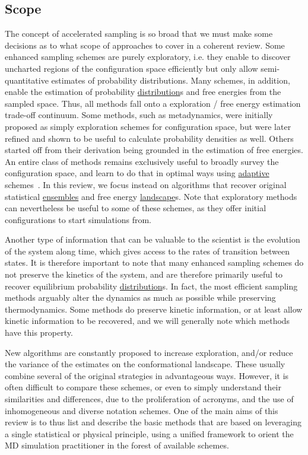 \documentclass[9pt,review]{livecoms}
\begin{document}
\subsection{Scope}
The concept of accelerated sampling is so broad that we must make some decisions as to what scope of approaches to cover in a coherent review.
Some enhanced sampling schemes are purely exploratory, i.e. they enable to discover uncharted regions of the configuration space efficiently but only allow semi-quantitative estimates of probability distributions. Many schemes, in addition, enable the estimation of probability \hyperlink{ref:Distribution} {distribution}s and free energies from the sampled space. Thus, all methods fall onto a exploration / free energy estimation trade-off continuum. Some methods, such as metadynamics, were initially proposed as simply exploration schemes for configuration space, but were later refined and shown to be useful to calculate probability densities as well.  Others started off from their derivation being grounded in the estimation of free energies. An entire class of methods remains exclusively useful to broadly survey the configuration space, and learn to do that in optimal ways using \hyperlink{ref:Adaptive} {adaptive} schemes~\cite{ChiavazzoE5494}. In this review, we focus instead on algorithms that recover original statistical \hyperlink{ref:Ensemble} {ensembles} and free energy \hyperlink{ref:FES} {landscape}s. Note that exploratory methods can nevertheless be useful to some of these schemes, as they offer initial configurations to start simulations from.

Another type of information that can be valuable to the scientist is the evolution of the system along time, which gives access to the rates of transition between states. It is therefore important to note that many enhanced sampling schemes do not preserve the kinetics of the system, and are therefore primarily useful to recover equilibrium probability \hyperlink{ref:Distribution} {distribution}s. In fact, the most efficient sampling methods arguably alter the dynamics as much as possible while preserving thermodynamics. Some methods do preserve kinetic information, or at least allow kinetic information to be recovered, and we will generally note which methods have this property.

New algorithms are constantly proposed to increase exploration, and/or reduce the variance of the estimates on the conformational landscape. These usually combine several of the original strategies in advantageous ways. However, it is often difficult to compare these schemes, or even to simply understand their similarities and differences, due to the proliferation of acronyms, and the use of inhomogeneous and diverse notation schemes. One of the main aims of this review is to thus list and describe the basic methods that are based on leveraging a single statistical or physical principle, using a unified framework to orient the MD simulation practitioner in the forest of available schemes.
\end{document}
